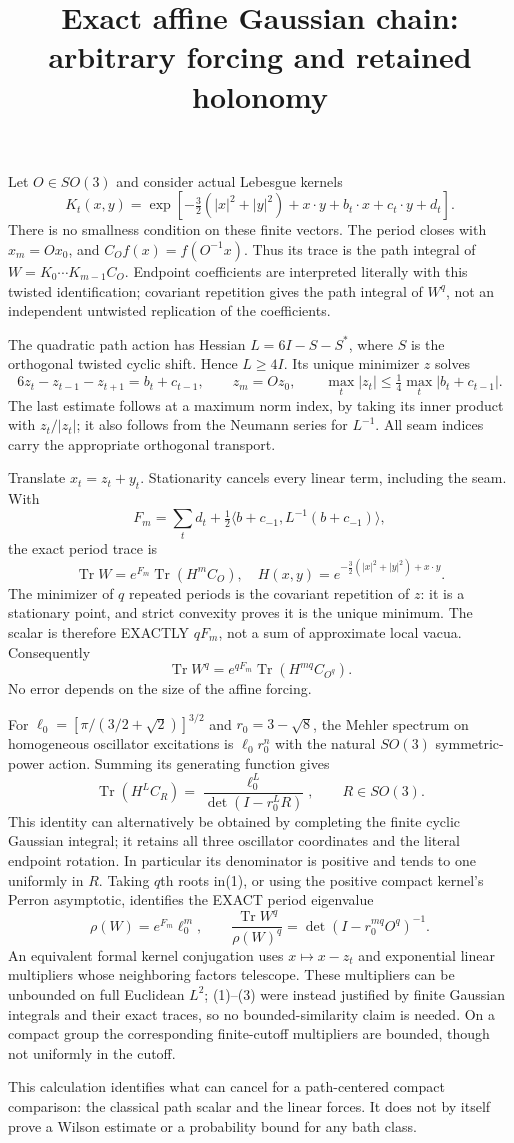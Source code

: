 \documentclass[11pt]{article}
\title{Exact affine Gaussian chain: arbitrary forcing and retained holonomy}\author{}\date{}
\begin{document}
\maketitle
Let $O\in SO(3)$ and consider actual Lebesgue kernels
\[
 K_t(x,y)=\exp[-\tfrac32(|x|^2+|y|^2)+x\cdot y+b_t\cdot x+c_t\cdot y+d_t].
\]
There is no smallness condition on these finite vectors. The period closes with
$x_m=Ox_0$, and $C_Of(x)=f(O^{-1}x)$. Thus its trace is the path integral of
$W=K_0\cdots K_{m-1}C_O$. Endpoint coefficients are interpreted literally with
this twisted identification; covariant repetition gives the path integral of
$W^q$, not an independent untwisted replication of the coefficients.

The quadratic path action has Hessian $L=6I-S-S^*$, where $S$ is the orthogonal
twisted cyclic shift. Hence $L\ge4I$. Its unique minimizer $z$ solves
\[
 6z_t-z_{t-1}-z_{t+1}=b_t+c_{t-1},\qquad z_m=Oz_0,
 \qquad \max_t|z_t|\le\tfrac14\max_t|b_t+c_{t-1}|.
\]
The last estimate follows at a maximum norm index, by taking its inner product
with $z_t/|z_t|$; it also follows from the Neumann series for $L^{-1}$.
All seam indices carry the appropriate orthogonal transport.

Translate $x_t=z_t+y_t$. Stationarity cancels every linear term, including the
seam. With
\[
 F_m=\sum_t d_t+\tfrac12\langle b+c_{-1},L^{-1}(b+c_{-1})\rangle,
\]
the exact period trace is
\[
 \operatorname{Tr}W=e^{F_m}\operatorname{Tr}(H^m C_O),\quad
 H(x,y)=e^{-\frac32(|x|^2+|y|^2)+x\cdot y}.
\]
The minimizer of $q$ repeated periods is the covariant repetition of $z$:
it is a stationary point, and strict convexity proves it is the unique minimum.
The scalar is therefore EXACTLY $qF_m$, not a sum of approximate local vacua.
Consequently
\[
 \operatorname{Tr}W^q=e^{qF_m}\operatorname{Tr}(H^{mq} C_{O^q}).                 \tag{1}
\]
No error depends on the size of the affine forcing.

For $\ell_0=[\pi/(3/2+\sqrt2)]^{3/2}$ and $r_0=3-\sqrt8$, the Mehler spectrum
on homogeneous oscillator excitations is $\ell_0r_0^n$ with the natural
$SO(3)$ symmetric-power action. Summing its generating function gives
\[
 \operatorname{Tr}(H^L C_R)=\frac{\ell_0^L}{\det(I-r_0^L R)},\qquad R\in SO(3).
                                                                            \tag{2}
\]
This identity can alternatively be obtained by completing the finite cyclic
Gaussian integral; it retains all three oscillator coordinates and the literal
endpoint rotation. In particular its denominator is positive and tends to one
uniformly in $R$. Taking $q$th roots in(1), or using the positive compact kernel's
Perron asymptotic, identifies the EXACT period eigenvalue
\[
 \rho(W)=e^{F_m}\ell_0^m,\qquad
 \frac{\operatorname{Tr}W^q}{\rho(W)^q}
       =\det(I-r_0^{mq}O^q)^{-1}.                                          \tag{3}
\]
An equivalent formal kernel conjugation uses $x\mapsto x-z_t$ and exponential
linear multipliers whose neighboring factors telescope. These multipliers can
be unbounded on full Euclidean $L^2$; (1)--(3) were instead justified by finite
Gaussian integrals and their exact traces, so no bounded-similarity claim is
needed. On a compact group the corresponding finite-cutoff multipliers are
bounded, though not uniformly in the cutoff.

This calculation identifies what can cancel for a path-centered compact
comparison: the classical path scalar and the linear forces. It does not by
itself prove a Wilson estimate or a probability bound for any bath class.
\end{document}
